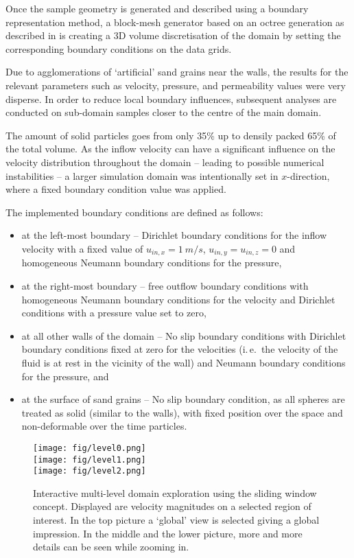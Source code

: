 \documentclass[10pt, conference]{IEEEtran}
\begin{document}
Once the sample geometry is generated and described using a boundary representation method, a block-mesh generator based on an octree generation as described in \cite{Mundani2006} is
creating a 3D volume discretisation of the domain by setting the corresponding boundary conditions on the data grids.

Due to agglomerations of `artificial' sand grains near the walls, the results for the relevant parameters such as velocity, pressure, and permeability values were very disperse. In order to reduce
local boundary influences, subsequent analyses are conducted on sub-domain samples closer to the centre of the main domain.

The amount of solid particles goes from only 35\% up to densily packed 65\% of the total volume. As the inflow velocity can have a significant influence on the velocity distribution throughout the
domain -- leading to possible numerical instabilities -- a larger simulation domain was intentionally set in $x$-direction, where a fixed boundary condition value was applied.

The implemented boundary conditions are defined as follows:
\begin{itemize}
\item at the left-most boundary -- Dirichlet boundary conditions for the inflow velocity with a fixed value of $u_{in,x} = 1~m/s$, $u_{in,y} = u_{in,z} = 0$ and homogeneous Neumann boundary
conditions for the pressure,
\item at the right-most boundary -- free outflow boundary conditions with homogeneous Neumann boundary conditions for the velocity and Dirichlet conditions with a pressure value set to zero,
\item at all other walls of the domain -- No slip boundary conditions with Dirichlet boundary conditions fixed at zero for the velocities (i.\,e.\ the velocity of the fluid is at rest in the vicinity of the wall)
and Neumann boundary conditions for the pressure, and
\item at the surface of sand grains -- No slip boundary condition, as all spheres are treated as solid (similar to the walls), with fixed position over the space and non-deformable over the time
particles.  
\end{itemize}     



\begin{figure}[ht]
\centering
\texttt{[image: fig/level0.png]}\\
\vspace{0.25cm}
\texttt{[image: fig/level1.png]}\\
\vspace{0.25cm}
\texttt{[image: fig/level2.png]}
\caption{Interactive multi-level domain exploration using the sliding window concept. Displayed are velocity magnitudes on a selected region of interest. In the top picture a `global' view is selected giving a global impression. In the middle and the lower picture, more and more details can be seen while zooming in.}
\label{fig:sliding_window_example}
\end{figure}
\end{document}
